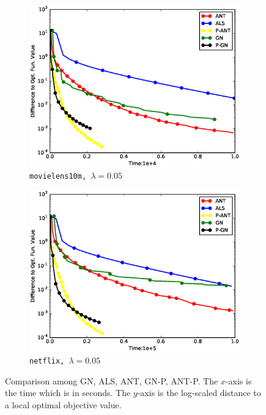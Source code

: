 \documentclass[11pt,twoside]{article}
\begin{document}
\begin{figure}
    \centering
    \begin{subfigure}[b]{0.32\textwidth}
        \centering
        \includegraphics[width=1.03\textwidth]{./figures/ml.obj.eps}
        \caption{\tt movielens10m, $\lambda=0.05$}
    \end{subfigure}
    \begin{subfigure}[b]{0.32\textwidth}
        \centering
        \includegraphics[width=1.03\textwidth]{./figures/nf.obj.eps}
        \caption{\tt netflix, $\lambda=0.05$}
    \end{subfigure}
        \caption{Comparison among GN, ALS, ANT, GN-P, ANT-P.
             The $x$-axis is the time which is in seconds.
             The $y$-axis is the log-scaled distance to a local optimal objective value.}
    \label{fig:freqobjvstime}
\end{figure}
\end{document}
